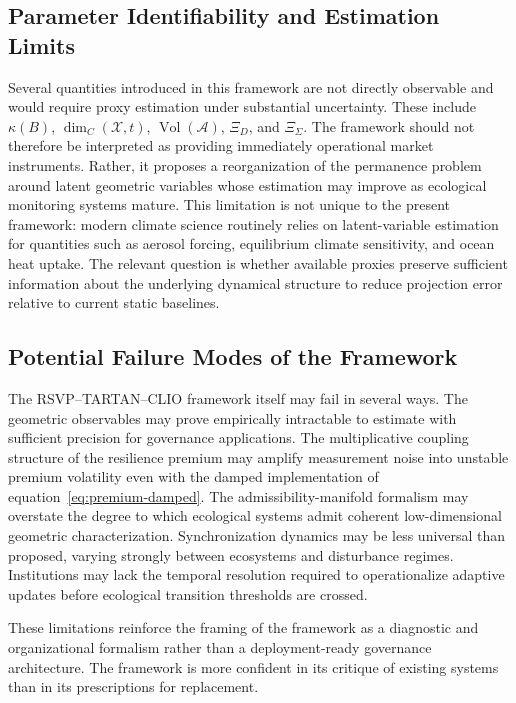 \documentclass[12pt]{article}
\newcommand{\Xcal}{\mathcal{X}}
\newcommand{\Acal}{\mathcal{A}}
\newcommand{\vol}{\operatorname{Vol}}
\begin{document}
\subsection{Parameter Identifiability and Estimation Limits}

Several quantities introduced in this framework are not directly observable and would
require proxy estimation under substantial uncertainty. These include
$\kappa(B)$, $\dim_C(\Xcal,t)$, $\vol(\Acal)$, $\Xi_D$, and $\Xi_\Sigma$.
The framework should not therefore be interpreted as providing immediately operational
market instruments. Rather, it proposes a reorganization of the permanence problem
around latent geometric variables whose estimation may improve as ecological monitoring
systems mature. This limitation is not unique to the present framework: modern climate
science routinely relies on latent-variable estimation for quantities such as aerosol
forcing, equilibrium climate sensitivity, and ocean heat uptake. The relevant question
is whether available proxies preserve sufficient information about the underlying
dynamical structure to reduce projection error relative to current static baselines.

\subsection{Potential Failure Modes of the Framework}

The RSVP--TARTAN--CLIO framework itself may fail in several ways. The geometric
observables may prove empirically intractable to estimate with sufficient precision for
governance applications. The multiplicative coupling structure of the resilience premium
may amplify measurement noise into unstable premium volatility even with the damped
implementation of equation~\eqref{eq:premium-damped}. The admissibility-manifold
formalism may overstate the degree to which ecological systems admit coherent
low-dimensional geometric characterization. Synchronization dynamics may be less
universal than proposed, varying strongly between ecosystems and disturbance regimes.
Institutions may lack the temporal resolution required to operationalize adaptive
updates before ecological transition thresholds are crossed.

These limitations reinforce the framing of the framework as a diagnostic and
organizational formalism rather than a deployment-ready governance architecture. The
framework is more confident in its critique of existing systems than in its
prescriptions for replacement.
\end{document}
